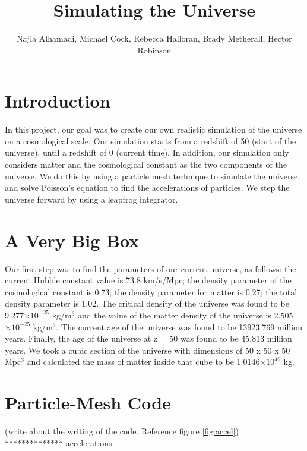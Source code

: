 \documentclass[10pt]{article}
\title{Simulating the Universe}
\author{Najla Alhamadi, Michael Cock, Rebecca Halloran, Brady Metherall, Hector Robinson}
\providecommand{\e}[1]{\ensuremath{\times 10^{#1}}}
\begin{document}
\maketitle
\section{Introduction}
	In this project, our goal was to create our own realistic simulation of the universe on a cosmological scale. Our simulation starts from a redshift of 50 (start of the universe), until a redshift of 0 (current time). In addition, our simulation only considers matter and the cosmological constant as the two components of the universe. We do this by using a particle mesh technique to simulate the universe, and solve Poisson's equation to find the accelerations of particles. We step the universe forward by using a leapfrog integrator.
	
\section{A Very Big Box}
	Our first step was to find the parameters of our current universe, as follows: the current Hubble constant value is 73.8 km/s/Mpc; the density parameter of the cosmological constant is 0.73; the density parameter for matter is 0.27; the total density parameter is 1.02. The critical density of the universe was found to be 9.277\e{-25} kg/m$^3$ and the value of the matter density of the universe is 2.505\e{-25} kg/m$^3$. The current age of the universe was found to be 13923.769 million years. Finally, the age of the universe at z = 50 was found to be 45.813 million years. We took a cubic section of the universe with dimensions of 50 x 50 x 50 Mpc$^3$ and calculated the mass of matter inside that cube to be 1.0146\e{46} kg.  
	
\section{Particle-Mesh Code}
 (write about the writing of the code. Reference figure \ref{fig:accel}) \\
************** accelerations
\end{document}
